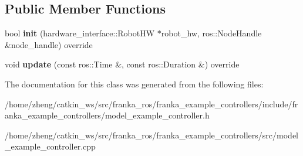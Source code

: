 \subsection*{Public Member Functions}
\begin{DoxyCompactItemize}
\item 
\mbox{\label{classfranka__example__controllers_1_1_model_example_controller_a423f7ebfd4e0b81cdfbefbdb002cde37}} 
bool {\bfseries init} (hardware\+\_\+interface\+::\+Robot\+HW $\ast$robot\+\_\+hw, ros\+::\+Node\+Handle \&node\+\_\+handle) override
\item 
\mbox{\label{classfranka__example__controllers_1_1_model_example_controller_ac80410c22f5e1c98da93ba150a390d2d}} 
void {\bfseries update} (const ros\+::\+Time \&, const ros\+::\+Duration \&) override
\end{DoxyCompactItemize}


The documentation for this class was generated from the following files\+:\begin{DoxyCompactItemize}
\item 
/home/zheng/catkin\+\_\+ws/src/franka\+\_\+ros/franka\+\_\+example\+\_\+controllers/include/franka\+\_\+example\+\_\+controllers/model\+\_\+example\+\_\+controller.\+h\item 
/home/zheng/catkin\+\_\+ws/src/franka\+\_\+ros/franka\+\_\+example\+\_\+controllers/src/model\+\_\+example\+\_\+controller.\+cpp\end{DoxyCompactItemize}
